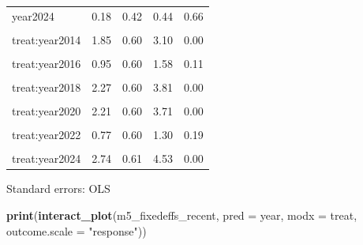 \documentclass[
]{article}
\newenvironment{Shaded}{\begin{snugshade}}{\end{snugshade}}
\newcommand{\AttributeTok}[1]{\textcolor[rgb]{0.13,0.29,0.53}{#1}}
\newcommand{\FunctionTok}[1]{\textcolor[rgb]{0.13,0.29,0.53}{\textbf{#1}}}
\newcommand{\NormalTok}[1]{#1}
\newcommand{\StringTok}[1]{\textcolor[rgb]{0.31,0.60,0.02}{#1}}
\begin{document}
\begin{table}[!h]
\begin{threeparttable}
\begin{tabular}{lrrrr}
year2024 & 0.18 & 0.42 & 0.44 & 0.66\\
\cellcolor{gray!10}{treat:year2013} & \cellcolor{gray!10}{1.16} & \cellcolor{gray!10}{0.60} & \cellcolor{gray!10}{1.94} & \cellcolor{gray!10}{0.05}\\
\addlinespace
treat:year2014 & 1.85 & 0.60 & 3.10 & 0.00\\
\cellcolor{gray!10}{treat:year2015} & \cellcolor{gray!10}{2.25} & \cellcolor{gray!10}{0.60} & \cellcolor{gray!10}{3.77} & \cellcolor{gray!10}{0.00}\\
treat:year2016 & 0.95 & 0.60 & 1.58 & 0.11\\
\cellcolor{gray!10}{treat:year2017} & \cellcolor{gray!10}{1.22} & \cellcolor{gray!10}{0.60} & \cellcolor{gray!10}{2.04} & \cellcolor{gray!10}{0.04}\\
treat:year2018 & 2.27 & 0.60 & 3.81 & 0.00\\
\addlinespace
\cellcolor{gray!10}{treat:year2019} & \cellcolor{gray!10}{1.52} & \cellcolor{gray!10}{0.60} & \cellcolor{gray!10}{2.55} & \cellcolor{gray!10}{0.01}\\
treat:year2020 & 2.21 & 0.60 & 3.71 & 0.00\\
\cellcolor{gray!10}{treat:year2021} & \cellcolor{gray!10}{1.86} & \cellcolor{gray!10}{0.60} & \cellcolor{gray!10}{3.12} & \cellcolor{gray!10}{0.00}\\
treat:year2022 & 0.77 & 0.60 & 1.30 & 0.19\\
\cellcolor{gray!10}{treat:year2023} & \cellcolor{gray!10}{1.48} & \cellcolor{gray!10}{0.60} & \cellcolor{gray!10}{2.47} & \cellcolor{gray!10}{0.01}\\
\addlinespace
treat:year2024 & 2.74 & 0.61 & 4.53 & 0.00\\
\bottomrule
\end{tabular}
\begin{tablenotes}
\item Standard errors: OLS
\end{tablenotes}
\end{threeparttable}
\end{table}

\begin{Shaded}
\begin{Highlighting}[]
\FunctionTok{print}\NormalTok{(}\FunctionTok{interact\_plot}\NormalTok{(m5\_fixedeffs\_recent, }\AttributeTok{pred =}\NormalTok{ year, }\AttributeTok{modx =}\NormalTok{ treat,}
              \AttributeTok{outcome.scale =} \StringTok{"response"}\NormalTok{))}
\end{Highlighting}
\end{Shaded}
\end{document}
